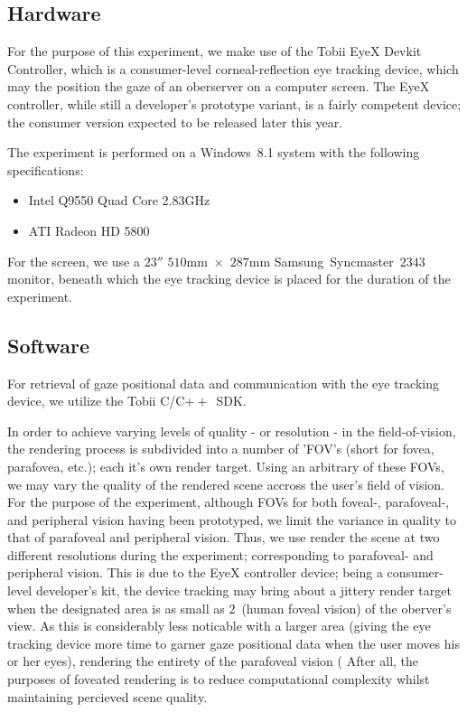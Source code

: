 \subsection{Hardware}
For the purpose of this experiment, we make use of the Tobii EyeX Devkit Controller, which is a consumer-level corneal-reflection eye tracking device, which may the position the gaze of an oberserver on a computer screen.
The EyeX controller, while still a developer's prototype variant, is a fairly competent device; the consumer version expected to be released later this year.

The experiment is performed on a Windows~8.1 system with the following specifications:
\begin{itemize}
\setlength\itemsep{0em}
\item Intel Q9550 Quad Core 2.83GHz
\item ATI Radeon HD 5800
\end{itemize}

For the screen, we use a $23''$ $510$mm~$\times$~$287$mm Samsung~Syncmaster~$2343$ monitor, beneath which the eye tracking device is placed for the duration of the experiment.

\subsection{Software}
For retrieval of gaze positional data and communication with the eye tracking device, we utilize the Tobii C/C$++$~SDK.

In order to achieve varying levels of quality - or resolution - in the field-of-vision, the rendering process is subdivided into a number of 'FOV's (short for fovea, parafovea, etc.); each it's own render target.
Using an arbitrary of these FOVs, we may vary the quality of the rendered scene accross the user's field of vision.
For the purpose of the experiment, although FOVs for both foveal-, parafoveal-, and peripheral vision having been prototyped, we limit the variance in quality to that of parafoveal and peripheral vision.
Thus, we use render the scene at two different resolutions during the experiment; corresponding to parafoveal- and peripheral vision.
This is due to the EyeX controller device; being a consumer-level developer's kit, the device tracking may bring about a jittery render target when the designated area is as small as $2$\degree\ (human foveal vision) of the oberver's view.
As this is considerably less noticable with a larger area (giving the eye tracking device more time to garner gaze positional data when the user moves his or her eyes), rendering the entirety of the parafoveal vision (%
After all, the purposes of foveated rendering is to reduce computational complexity whilst maintaining percieved scene quality.

